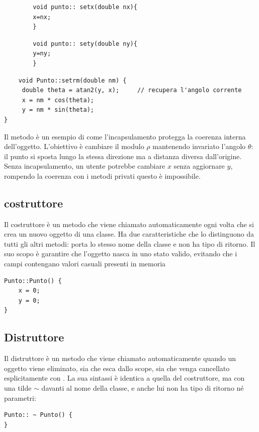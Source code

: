 \begin{codebox}
    \begin{lstlisting}
        void punto:: setx(double nx){
        x=nx;
        }
    \end{lstlisting}
\end{codebox}

\begin{codebox}
    \begin{lstlisting}
        void punto:: sety(double ny){
        y=ny;
        }
    \end{lstlisting}
\end{codebox}
\begin{codebox}
    \begin{lstlisting}
    void Punto::setrm(double nm) {
     double theta = atan2(y, x);     // recupera l'angolo corrente
     x = nm * cos(theta);
     y = nm * sin(theta);
}
    \end{lstlisting}
\end{codebox}


Il metodo è un esempio di come l'incapsulamento protegga la coerenza interna dell'oggetto. L'obiettivo è cambiare il modulo $\rho$ mantenendo invariato l'angolo $\theta$: il punto si sposta lungo la stessa direzione ma a distanza diversa dall'origine. Senza incapsulamento, un utente potrebbe cambiare $x$ senza aggiornare $y$, rompendo la coerenza  con i metodi privati questo è impossibile.

\subsection{costruttore}

Il costruttore è un metodo  che viene chiamato automaticamente ogni volta che si crea un nuovo oggetto di una classe. Ha due caratteristiche che lo distinguono da tutti gli altri metodi: porta lo stesso nome della classe e non ha tipo di ritorno. Il suo scopo è garantire che l'oggetto nasca in uno stato valido, evitando che i campi contengano valori casuali presenti in memoria
\begin{codebox}
    \begin{lstlisting}
Punto::Punto() {
    x = 0;
    y = 0;
}\end{lstlisting}
\end{codebox}



\subsection{Distruttore}
Il distruttore è un metodo che viene chiamato automaticamente quando un oggetto viene eliminato, sia che esca dallo scope, sia che venga cancellato esplicitamente con . La sua sintassi è identica a quella del costruttore, ma con una tilde $\sim$ davanti al nome della classe, e anche lui non ha tipo di ritorno né parametri:
\begin{codebox}
    \begin{lstlisting}
Punto:: ~ Punto() {  
} \end{lstlisting}
\end{codebox}



